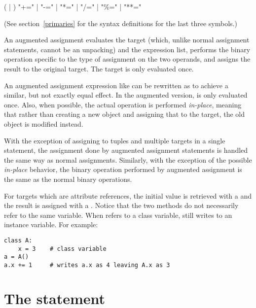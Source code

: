 \begin{productionlist}
             { 
              ( | )}
             {"+=" | "-=" | "*=" | "/=" | "\%=" | "**="}
\end{productionlist}

(See section~\ref{primaries} for the syntax definitions for the last
three symbols.)

An augmented assignment evaluates the target (which, unlike normal
assignment statements, cannot be an unpacking) and the expression
list, performs the binary operation specific to the type of assignment
on the two operands, and assigns the result to the original
target.  The target is only evaluated once.

An augmented assignment expression like  can be rewritten as
 to achieve a similar, but not exactly equal effect. In the
augmented version,  is only evaluated once. Also, when possible, the
actual operation is performed \emph{in-place}, meaning that rather than
creating a new object and assigning that to the target, the old object is
modified instead.

With the exception of assigning to tuples and multiple targets in a single
statement, the assignment done by augmented assignment statements is handled
the same way as normal assignments. Similarly, with the exception of the
possible \emph{in-place} behavior, the binary operation performed by
augmented assignment is the same as the normal binary operations.

For targets which are attribute references, the initial value is
retrieved with a  and the result is assigned with a
.  Notice that the two methods do not necessarily
refer to the same variable.  When  refers to a class
variable,  still writes to an instance variable.
For example:

\begin{verbatim}
class A:
    x = 3    # class variable
a = A()
a.x += 1     # writes a.x as 4 leaving A.x as 3
\end{verbatim}


\section{The  statement \label{pass}}

